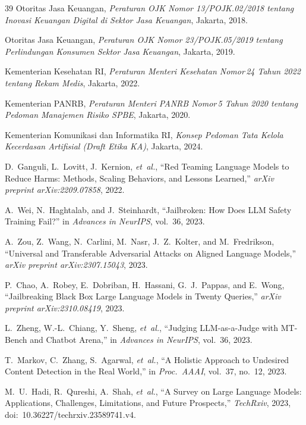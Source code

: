 ﻿\documentclass[conference]{IEEEtran}
\begin{document}
\begin{thebibliography}{39}
Otoritas Jasa Keuangan, \textit{Peraturan OJK Nomor 13/POJK.02/2018 tentang
Inovasi Keuangan Digital di Sektor Jasa Keuangan}, Jakarta, 2018.

Otoritas Jasa Keuangan, \textit{Peraturan OJK Nomor 23/POJK.05/2019 tentang
Perlindungan Konsumen Sektor Jasa Keuangan}, Jakarta, 2019.

Kementerian Kesehatan RI, \textit{Peraturan Menteri Kesehatan Nomor\,24 Tahun
2022 tentang Rekam Medis}, Jakarta, 2022.

Kementerian PANRB, \textit{Peraturan Menteri PANRB Nomor\,5 Tahun 2020 tentang
Pedoman Manajemen Risiko SPBE}, Jakarta, 2020.

Kementerian Komunikasi dan Informatika RI, \textit{Konsep Pedoman Tata Kelola
Kecerdasan Artifisial (Draft Etika KA)}, Jakarta, 2024.

D.~Ganguli, L.~Lovitt, J.~Kernion, \textit{et~al.}, ``Red Teaming Language
Models to Reduce Harms: Methods, Scaling Behaviors, and Lessons Learned,''
\textit{arXiv preprint arXiv:2209.07858}, 2022.

A.~Wei, N.~Haghtalab, and J.~Steinhardt, ``Jailbroken: How Does LLM Safety
Training Fail?'' in \textit{Advances in NeurIPS}, vol.~36, 2023.

A.~Zou, Z.~Wang, N.~Carlini, M.~Nasr, J.~Z.~Kolter, and M.~Fredrikson,
``Universal and Transferable Adversarial Attacks on Aligned Language Models,''
\textit{arXiv preprint arXiv:2307.15043}, 2023.

P.~Chao, A.~Robey, E.~Dobriban, H.~Hassani, G.~J.~Pappas, and E.~Wong,
``Jailbreaking Black Box Large Language Models in Twenty Queries,''
\textit{arXiv preprint arXiv:2310.08419}, 2023.

L.~Zheng, W.-L.~Chiang, Y.~Sheng, \textit{et~al.}, ``Judging LLM-as-a-Judge
with MT-Bench and Chatbot Arena,'' in \textit{Advances in NeurIPS}, vol.~36,
2023.

T.~Markov, C.~Zhang, S.~Agarwal, \textit{et~al.}, ``A Holistic Approach to
Undesired Content Detection in the Real World,'' in \textit{Proc.\ AAAI},
vol.~37, no.~12, 2023.

M.~U.~Hadi, R.~Qureshi, A.~Shah, \textit{et~al.}, ``A Survey on Large Language
Models: Applications, Challenges, Limitations, and Future Prospects,''
\textit{TechRxiv}, 2023, doi:~10.36227/techrxiv.23589741.v4.


\end{thebibliography}
\end{document}
